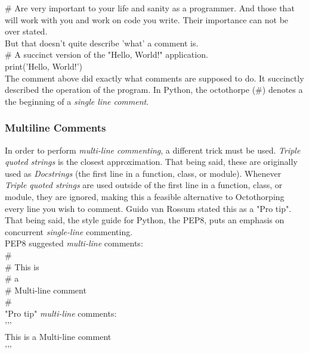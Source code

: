 \documentclass[oneside,12pt]{memoir} %
\begin{document}
\# Are very important to your life and sanity as a programmer. And those that will work with you and work on code you write. Their importance can not be over stated.\\

But that doesn't quite describe 'what' a comment is. \\
\# A succinct version of the "Hello, World!" application.\\

print('Hello, World!') \\


The comment above did exactly what comments are supposed to do. It succinctly described the operation of the program. In Python, the octothorpe (\#) denotes a the beginning of a \emph{single line comment}.\\

\subsubsection{Multiline Comments}
\label{sub:sub:multiline_comments}

In order to perform \emph{multi-line commenting}, a different trick must be used. \emph{Triple quoted strings} is the closest approximation. That being said, these are originally used as \emph{Docstrings } (the first line in a function, class, or module). Whenever \emph{Triple quoted strings} are used outside of the first line in a function, class, or module, they are ignored, making this a feasible alternative to Octothorping every line you wish to comment. Guido van Rossum stated this as a "Pro tip".\\

That being said, the style guide for Python, the PEP8, puts an emphasis on concurrent \emph{single-line} commenting.\\

PEP8 suggested \emph{multi-line} comments:\\
\#\\
\# This is\\
\# a\\
\# Multi-line comment\\
\#\\

"Pro tip" \emph{multi-line} comments:\\
{'}{'}{'}\\
This is a Multi-line comment\\
{'}{'}{'}\\
\end{document}
